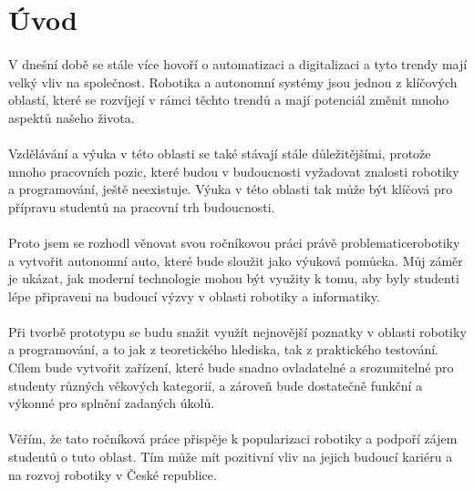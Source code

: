 \documentclass{article}
\begin{document}
	\newpage
	\tableofcontents
	
	\newpage
	\section*{Úvod}
	\paragraph{} V dnešní době se stále více hovoří o automatizaci a digitalizaci a tyto trendy mají velký vliv na společnost. Robotika a autonomní systémy jsou jednou z klíčových oblastí, které se rozvíjejí v rámci těchto trendů a mají potenciál změnit mnoho aspektů našeho života.
	\paragraph{} Vzdělávání a výuka v této oblasti se také stávají stále důležitějšími, protože mnoho pracovních pozic, které budou v budoucnosti vyžadovat znalosti robotiky a programování, ještě neexistuje. Výuka v této oblasti tak může být klíčová pro přípravu studentů na pracovní trh budoucnosti.
	\paragraph{} Proto jsem se rozhodl věnovat svou ročníkovou práci právě problematicerobotiky a vytvořit autonomní auto, které bude sloužit jako výuková pomůcka. Můj záměr je ukázat, jak moderní technologie mohou být využity k tomu, aby byly studenti lépe připraveni na budoucí výzvy v oblasti robotiky a informatiky.
	\paragraph{} Při tvorbě prototypu se budu snažit využít nejnovější poznatky v oblasti robotiky a programování, a to jak z teoretického hlediska, tak z praktického testování. Cílem bude vytvořit zařízení, které bude snadno ovladatelné a srozumitelné pro studenty různých věkových kategorií, a zároveň bude dostatečně funkční a výkonné pro splnění zadaných úkolů.
	\paragraph{} Věřím, že tato ročníková práce přispěje k popularizaci robotiky a podpoří zájem studentů o tuto oblast. Tím může mít pozitivní vliv na jejich budoucí kariéru a na rozvoj robotiky v České republice.
	
\end{document}
